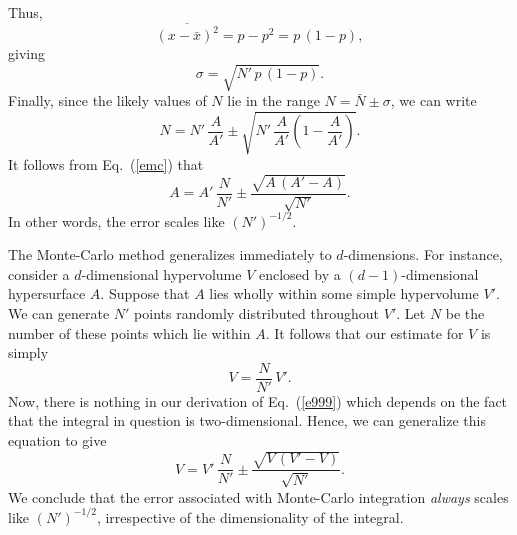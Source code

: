 Thus,
\begin{equation}
\overline{(x-\bar{x})^2}= p -p^2 =p\,(1-p),
\end{equation}
giving
\begin{equation}
\sigma = \sqrt{N'\,p\,(1-p)}.
\end{equation}
Finally, since the likely values of $N$ lie
in the range $N=\bar{N}\pm\sigma$, we can write
\begin{equation}
N = N'\,\frac{A}{A'} \pm \sqrt{N'\,\frac{A}{A'}\left(1-\frac{A}{A'}\right)}.
\end{equation}
It follows from Eq.~(\ref{emc}) that
\begin{equation}\label{e999}
A = A'\,\frac{N}{N'} \pm \frac{\sqrt{A\,(A'-A)}}{\sqrt{N'}}.
\end{equation}
In other words, the error scales like $(N')^{-1/2}$. 

The Monte-Carlo method generalizes immediately to $d$-dimensions.
For instance, consider a $d$-dimensional hypervolume $V$ enclosed by a
$(d-1)$-dimensional hypersurface $A$. Suppose that $A$ lies wholly
within some simple hypervolume $V'$. We can generate $N'$ points randomly
distributed throughout $V'$. Let $N$ be the number of these
points which lie within $A$. It follows that our estimate for $V$
is simply
\begin{equation}
V = \frac{N}{N'}\,V'.
\end{equation}
Now, there is nothing in our derivation of Eq.~(\ref{e999}) which depends on the
fact that the integral in question is two-dimensional. Hence, we can generalize
this equation to give
\begin{equation}
V = V'\,\frac{N}{N'} \pm \frac{\sqrt{V\,(V'-V)}}{\sqrt{N'}}.
\end{equation}
We conclude that the error associated with Monte-Carlo integration {\em always}
scales like $(N')^{-1/2}$, irrespective of the dimensionality of the integral.


